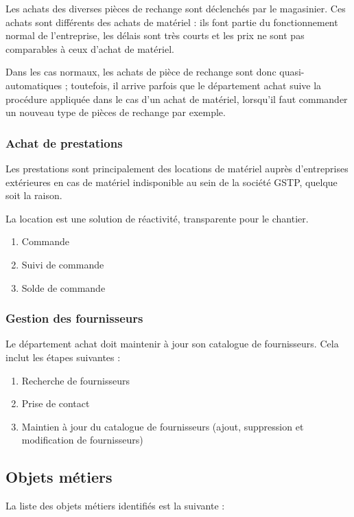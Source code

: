 Les achats des diverses pièces de rechange sont déclenchés
par le magasinier.
Ces achats sont différents des achats de matériel : ils font partie du
fonctionnement normal de l'entreprise, les délais sont très courts et les
prix ne sont pas comparables à ceux d'achat de matériel.

Dans les cas normaux, les achats de pièce de rechange sont donc
quasi-automatiques ; toutefois, il arrive parfois que le département achat
suive la procédure appliquée dans le cas d'un achat de matériel, lorsqu'il
faut commander un nouveau type de pièces de rechange par exemple.


\subsubsection{Achat de prestations}

Les prestations sont principalement des locations de matériel auprès
d'entreprises extérieures en cas de matériel indisponible au sein de la
société GSTP, quelque soit la raison.

La location est une solution de réactivité, transparente pour le chantier.

\begin{enumerate}
\item Commande 
\item Suivi de commande
\item Solde de commande
\end{enumerate}


\subsubsection{Gestion des fournisseurs}

Le département achat doit maintenir à jour son catalogue de fournisseurs.
Cela inclut les étapes suivantes :
\begin{enumerate}
\item Recherche de fournisseurs
\item Prise de contact
\item Maintien à jour du catalogue de fournisseurs (ajout, suppression et
        modification de fournisseurs)
\end{enumerate}


\subsection{Objets métiers}

La liste des objets métiers identifiés est la suivante :

